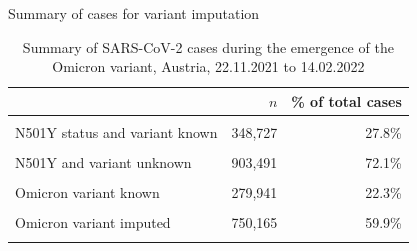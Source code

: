 \documentclass[
  ignorenonframetext,
  aspectratio=169,
]{beamer}
\begin{document}
\begin{frame}{Summary of cases for variant imputation}
\protect\hypertarget{summary-of-cases-for-variant-imputation}{}
\begin{table}
\caption{Summary of SARS-CoV-2 cases during the emergence of the Omicron variant, Austria,  22.11.2021 to 14.02.2022}
\centering
\begin{tabular}[t]{>{\raggedright\arraybackslash}p{7cm}rr}
\toprule
\textbf{} & \textbf{$n$} & \textbf{\% of total cases}\\
\midrule
\cellcolor{gray!6}{Total cases} & \cellcolor{gray!6}{1,253,256} & \cellcolor{gray!6}{100.0\%}\\
N501Y status and variant known & 348,727 & 27.8\%\\
\cellcolor{gray!6}{N501Y status known and variant unknown} & \cellcolor{gray!6}{1,038} & \cellcolor{gray!6}{0.1\%}\\
N501Y and variant unknown & 903,491 & 72.1\%\\
\midrule
\cellcolor{gray!6}{Other variant known} & \cellcolor{gray!6}{68,786} & \cellcolor{gray!6}{5.5\%}\\
Omicron variant known & 279,941 & 22.3\%\\
\cellcolor{gray!6}{Other variant imputed} & \cellcolor{gray!6}{154,364} & \cellcolor{gray!6}{12.3\%}\\
Omicron variant imputed & 750,165 & 59.9\%\\
\midrule
\cellcolor{gray!6}{cases with variant data imputed} & \cellcolor{gray!6}{904,529} & \cellcolor{gray!6}{72.2\%}\\
\bottomrule
\end{tabular}
\end{table}
\end{frame}
\end{document}
